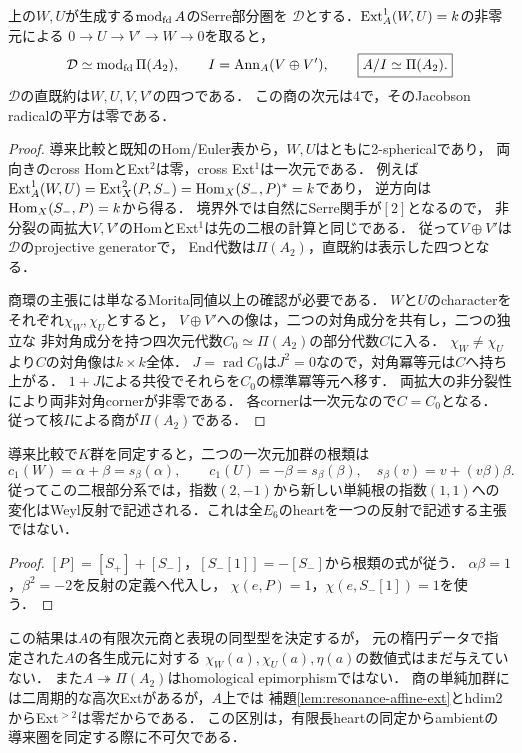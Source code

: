 \begin{theorem}[二つのcharacterが定める四次元商]
\label{thm:resonance-preprojective-quotient}
上の$W,U$が生成する$\operatorname{mod}_{\rm fd}A$のSerre部分圏を
$\mathcal D$とする．$\operatorname{Ext}_A^1(W,U)=k$の非零元による
$0\to U\to V'\to W\to0$を取ると，
\[
\mathcal D\simeq\operatorname{mod}_{\rm fd}\Pi(A_2),\qquad
I=\operatorname{Ann}_A(V\oplus V'),\qquad
\boxed{A/I\simeq\Pi(A_2).}
\]
$\mathcal D$の直既約は$W,U,V,V'$の四つである．
この商の次元は4で，そのJacobson radicalの平方は零である．
\end{theorem}
\begin{proof}
導来比較と既知のHom/Euler表から，$W,U$はともに2-sphericalであり，
両向きのcross HomとExt$^2$は零，cross Ext$^1$は一次元である．
例えば$\operatorname{Ext}_A^1(W,U)=\operatorname{Ext}_X^2(P,S_-)=\operatorname{Hom}_X(S_-,P)^*=k$であり，
逆方向は$\operatorname{Hom}_X(S_-,P)=k$から得る．
境界外では自然にSerre関手が$[2]$となるので，
非分裂の両拡大$V,V'$のHomとExt$^1$は先の二根の計算と同じである．
従って$V\oplus V'$は$\mathcal D$のprojective generatorで，
End代数は$\Pi(A_2)$，直既約は表示した四つとなる．

商環の主張には単なるMorita同値以上の確認が必要である．
$W$と$U$のcharacterをそれぞれ$\chi_W,\chi_U$とすると，
$V\oplus V'$への像は，二つの対角成分を共有し，二つの独立な
非対角成分を持つ四次元代数$C_0\simeq\Pi(A_2)$の部分代数$C$に入る．
$\chi_W\ne\chi_U$より$C$の対角像は$k\times k$全体．
$J=\operatorname{rad}C_0$は$J^2=0$なので，対角冪等元は$C$へ持ち上がる．
$1+J$による共役でそれらを$C_0$の標準冪等元へ移す．
両拡大の非分裂性により両非対角cornerが非零である．
各cornerは一次元なので$C=C_0$となる．
従って核$I$による商が$\Pi(A_2)$である．
\end{proof}
\begin{corollary}[二根部分系におけるWeyl反射]
\label{cor:resonance-weyl-reflection}
導来比較で$K$群を同定すると，二つの一次元加群の根類は
\[
c_1(W)=\alpha+\beta=s_\beta(\alpha),\qquad
c_1(U)=-\beta=s_\beta(\beta),
\quad s_\beta(v)=v+(v\beta)\beta.
\]
従ってこの二根部分系では，指数$(2,-1)$から新しい単純根の指数$(1,1)$への
変化はWeyl反射で記述される．これは全$E_6$のheartを一つの反射で記述する主張ではない．
\end{corollary}
\begin{proof}
$[P]=[S_+]+[S_-]$，$[S_-[1]]=-[S_-]$から根類の式が従う．
$\alpha\beta=1$，$\beta^2=-2$を反射の定義へ代入し，
$\chi(e,P)=1$，$\chi(e,S_-[1])=1$を使う．
\end{proof}

\begin{remark}[決定した表示と未計算の係数]
この結果は$A$の有限次元商と表現の同型型を決定するが，
元の楕円データで指定された$A$の各生成元に対する
$\chi_W(a),\chi_U(a),\eta(a)$の数値式はまだ与えていない．
また$A\twoheadrightarrow\Pi(A_2)$はhomological epimorphismではない．
商の単純加群には二周期的な高次Extがあるが，$A$上では
補題\ref{lem:resonance-affine-ext}とhdim2からExt$^{>2}$は零だからである．
この区別は，有限長heartの同定からambientの導来圏を同定する際に不可欠である．
\end{remark}
